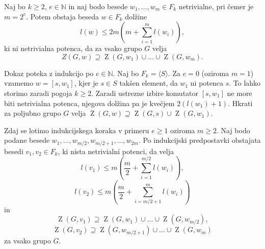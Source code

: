 \documentclass[mat1, tisk]{fmfdelo}
\numberwithin{equation}{section}  %
\begin{document}
\begin{lema}
    \label{lem_komutatorska_lema}
     Naj bo $k \ge 2$, $e \in  \mathbb{N}$ in naj bodo besede $w_1, \ldots, w_m \in F_k$ netrivialne, pri čemer je $m = 2^{e}$. Potem obstaja beseda $w \in F_k$
     dolžine \begin{equation*}
     l(w) \le 2m \left(m + \sum_{i=1}^{m} l(w_{i}) \right),
     \end{equation*}  
    ki ni netrivialna potenca, da za vsako grupo $G$ velja \begin{equation*}
    Z(G, w) \supseteq \operatorname{Z}(G, w_1) \cup \ldots \cup \operatorname{Z}(G, w_m).
    \end{equation*}       
    \end{lema}
    \begin{dokaz}
        Dokaz poteka z indukcijo po $e \in  \mathbb{N}$. Naj bo $F_k = \langle S \rangle$.  Za $e = 0$ (oziroma $m = 1$) vzamemo $w = [s, w_1]$, kjer je $s \in S$ takšen element, da $w_1$ ni potenca $s$. To lahko storimo zaradi pogoja $k \ge 2$. Zaradi ustrezne izbire komutator $[s, w_1]$ ne more biti netrivialna potenca, njegova dolžina pa je kvečjem $2(l(w_1)  + 1)$.
        Hkrati za poljubno grupo $G$ velja $\operatorname{Z}(G, w) \supseteq \operatorname{Z}(G, s) \cup \operatorname{Z}(G, w_1)$.
        
        Zdaj se lotimo indukcijskega koraka v primeru $e \ge 1$ oziroma $m \ge 2$. Naj bodo podane besede $w_1, \ldots, w_{m / 2}, w_{m / 2 + 1}, \ldots, w_{2m}$. Po indukcijski predpostavki obstajata besedi $v_1, v_2 \in  F_{k}$, ki nista netrivialni potenci, da velja
        \begin{equation*}
        l(v_1) \le m \left(\frac{m}{2} + \sum_{i=1}^{m / 2} l(w_{i}) \right),
        \end{equation*}  
        \begin{equation*}
            l(v_2) \le m \left(\frac{m}{2} + \sum_{i= m / 2 + 1}^{m} l(w_{i}) \right)
        \end{equation*}  
        in \begin{equation*}
        \operatorname{Z}(G, v_1) \supseteq \operatorname{Z}(G, w_1) \cup \ldots \cup \operatorname{Z}(G, w_{m / 2}),
        \end{equation*}  
        \begin{equation*}
            \operatorname{Z}(G, v_2) \supseteq \operatorname{Z}(G, w_{m / 2 + 1}) \cup \ldots \cup \operatorname{Z}(G, w_{m})
        \end{equation*}  
        za vsako grupo $G$.


\end{dokaz}
\end{document}
